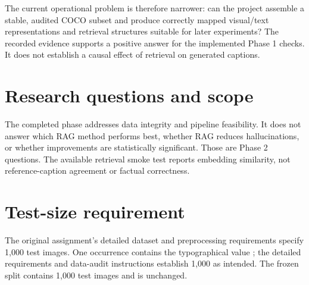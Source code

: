 The current operational problem is therefore narrower: can the project assemble a stable, audited COCO subset and produce correctly mapped visual/text representations and retrieval structures suitable for later experiments? The recorded evidence supports a positive answer for the implemented Phase 1 checks. It does not establish a causal effect of retrieval on generated captions.

\section{Research questions and scope}
The completed phase addresses data integrity and pipeline feasibility. It does not answer which RAG method performs best, whether RAG reduces hallucinations, or whether improvements are statistically significant. Those are Phase 2 questions. The available retrieval smoke test reports embedding similarity, not reference-caption agreement or factual correctness.

\section{Test-size requirement}
The original assignment's detailed dataset and preprocessing requirements specify 1,000 test images. One occurrence contains the typographical value ; the detailed requirements and data-audit instructions establish 1,000 as intended. The frozen split contains 1,000 test images and is unchanged.
